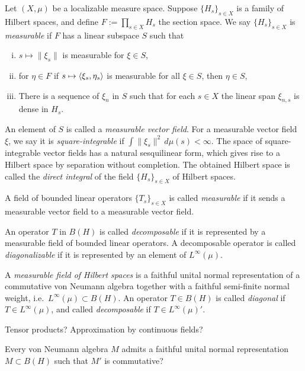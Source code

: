 \documentclass{../../large}
\begin{document}
\begin{prb}
Let $(X,\mu)$ be a localizable measure space.
Suppose $\{H_s\}_{s\in X}$ is a family of Hilbert spaces, and define $F:=\prod_{s\in X}H_s$ the section space.
We say $\{H_s\}_{s\in X}$ is \emph{measurable} if $F$ has a linear subspace $S$ such that
\begin{enumerate}[(i)]
\item $s\mapsto\|\xi_s\|$ is measurable for $\xi\in S$,
\item for $\eta\in F$ if $s\mapsto\langle\xi_s,\eta_s\rangle$ is measurable for all $\xi\in S$, then $\eta\in S$,
\item There is a sequence of $\xi_n$ in $S$ such that for each $s\in X$ the linear span $\xi_{n,s}$ is dense in $H_s$.
\end{enumerate}
An element of $S$ is called a \emph{measurable vector field}.
For a measurable vector field $\xi$, we say it is \emph{square-integrable} if $\int\|\xi_s\|^2\,d\mu(s)<\infty$.
The space of square-integrable vector fields has a natural sesquilinear form, which gives rise to a Hilbert space by separation without completion.
The obtained Hilbert space is called the \emph{direct integral} of the field $\{H_s\}_{s\in X}$ of Hilbert spaces.


A field of bounded linear operators $\{T_s\}_{s\in X}$ is called \emph{measurable} if it sends a measurable vector field to a measurable vector field.

An operator $T$ in $B(H)$ is called \emph{decomposable} if it is represented by a measurable field of bounded linear operators.
A decomposable operator is called \emph{diagonalizable} if it is represented by an element of $L^\infty(\mu)$.

\end{prb}


A \emph{measurable field of Hilbert spaces} is a faithful unital normal representation of a commutative von Neumann algebra together with a faithful semi-finite normal weight, i.e.~$L^\infty(\mu)\subset B(H)$.
An operator $T\in B(H)$ is called \emph{diagonal} if $T\in L^\infty(\mu)$, and called \emph{decomposable} if $T\in L^\infty(\mu)'$.

Tensor products?
Approximation by continuous fields?

Every von Neumann algebra $M$ admits a faithful unital normal representation $M\subset B(H)$ such that $M'$ is commutative?


\begin{prb}
\end{prb}
\end{document}
